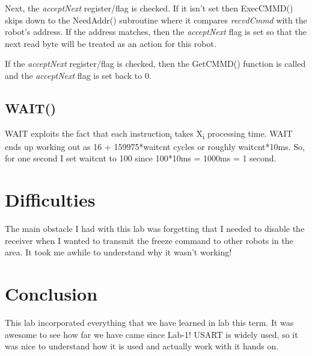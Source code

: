 \documentclass[12pt,letterpaper]{article}
\begin{document}
	Next, the \textit{acceptNext} register/flag is checked.
	If it isn't set then ExecCMMD() skips down to the NeedAddr() subroutine where it compares \textit{recvdCmmd} with the robot's address. 
	If the address matches, then the \textit{acceptNext} flag is set so that the next read byte will be treated as an action for this robot.
	
	If the \textit{acceptNext} register/flag is checked, then the GetCMMD() function is called and the \textit{acceptNext} flag is set back to 0.
	

\subsection{WAIT()}
WAIT exploits the fact that each instruction\textsubscript{i} takes X\textsubscript{i} processing time.
WAIT ends up working out as 16 + 159975*waitcnt cycles or roughly waitcnt*10ms.
So, for one second I set waitcnt to 100 since 100*10ms = 1000ms = 1 second.



\section{Difficulties}
	The main obstacle I had with this lab was forgetting that I needed to disable the receiver when I wanted to transmit the freeze command to other robots in the area.
	It took me awhile to understand why it wasn't working!
	 
\section{Conclusion}
		This lab incorporated everything that we have learned in lab this term.
		It was awesome to see how far we have came since Lab-1!
		USART is widely used, so it was nice to understand how it is used and actually work with it hands on.
\end{document}
